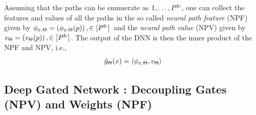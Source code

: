 \begin{proposition}
 Assuming that the paths can be enumerate as $1,\ldots, P^{\text{fc}}$, one can collect the features and values of all the paths in the so called \emph{neural path feature} (NPF) given by $\phi_{x,\Theta}=\left(\phi_{x,\Theta}(p)\right),\in[P^{\text{fc}}]$ and the \emph{neural path value} (NPV) given by $v_{\Theta}=\left(v_{\Theta}(p)\right),\in[P^{\text{fc}}]$. The output of the DNN is then the inner product of the NPF and NPV, i.e., 
\begin{align}
\hat{y}_{\Theta}(x)=\langle \phi_{x,\Theta},v_{\Theta}\rangle
\end{align}
\end{proposition}


\subsection{Deep Gated Network : Decoupling Gates (NPV) and Weights (NPF) }\label{sec:dgn}

